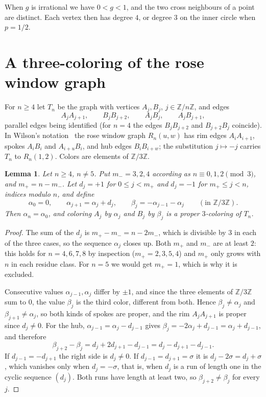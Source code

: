 \documentclass[11pt]{amsart}
\newtheorem{lemma}[theorem]{Lemma}
\theoremstyle{remark}
\numberwithin{equation}{section}
\newcommand{\Z}{\mathbb{Z}}
\begin{document}
When $g$ is irrational we have $0<g<1$, and the two cross neighbours of
a point are distinct. Each vertex then has degree $4$, or degree $3$ on
the inner circle when $p=1/2$.

\section{A three-coloring of the rose window graph}\label{sec:palette}

For $n\ge4$ let $T_n$ be the graph with vertices $A_j,B_j$,
$j\in\Z/n\Z$, and edges
\begin{equation}\label{eq:Tn}
A_jA_{j+1},\qquad B_jB_{j+2},\qquad A_jB_j,\qquad A_jB_{j+1},
\end{equation}
parallel edges being identified (for $n=4$ the edges $B_jB_{j+2}$ and
$B_{j+2}B_j$ coincide). In Wilson's notation~\cite{Wil08} the rose
window graph $R_n(u,w)$ has rim edges $A_iA_{i+1}$, spokes $A_iB_i$
and $A_{i+u}B_i$, and hub edges $B_iB_{i+w}$; the substitution
$j\mapsto-j$ carries $T_n$ to $R_n(1,2)$. Colors are elements of
$\Z/3\Z$.

\begin{lemma}\label{lem:palette}
Let $n\ge4$, $n\ne5$. Put $m_-=3,2,4$ according as $n\equiv0,1,2\pmod3$,
and $m_+=n-m_-$. Let $d_j=+1$ for $0\le j<m_+$ and $d_j=-1$ for
$m_+\le j<n$, indices modulo $n$, and define
\begin{equation}\label{eq:palette}
\alpha_0=0,\qquad \alpha_{j+1}=\alpha_j+d_j,\qquad \beta_j=-\alpha_{j-1}-\alpha_j\qquad(\text{in }\Z/3\Z).
\end{equation}
Then $\alpha_n=\alpha_0$, and coloring $A_j$ by $\alpha_j$ and $B_j$ by $\beta_j$ is a proper
$3$-coloring of $T_n$.
\end{lemma}

\begin{proof}
The sum of the $d_j$ is $m_+-m_-=n-2m_-$, which is divisible by $3$ in
each of the three cases, so the sequence $\alpha_j$ closes up. Both
$m_+$ and $m_-$ are at least $2$: this holds for $n=4,6,7,8$ by
inspection ($m_+=2,3,5,4$) and $m_+$ only grows with $n$ in each residue
class. For $n=5$ we would get $m_+=1$, which is why it is excluded.

Consecutive values $\alpha_{j-1},\alpha_j$ differ by $\pm1$, and since the three
elements of $\Z/3\Z$ sum to $0$, the value $\beta_j$ is the third color,
different from both. Hence $\beta_j\ne \alpha_j$ and $\beta_{j+1}\ne \alpha_j$, so both
kinds of spokes are proper, and the rim $A_jA_{j+1}$ is proper since
$d_j\ne0$. For the hub, $\alpha_{j-1}=\alpha_j-d_{j-1}$ gives
$\beta_j=-2\alpha_j+d_{j-1}=\alpha_j+d_{j-1}$, and therefore
\begin{equation}\label{eq:hub}
\beta_{j+2}-\beta_j=d_j+2d_{j+1}-d_{j-1}=d_j-d_{j+1}-d_{j-1}.
\end{equation}
If $d_{j-1}=-d_{j+1}$ the right side is $d_j\ne0$. If
$d_{j-1}=d_{j+1}=\sigma$ it is $d_j-2\sigma=d_j+\sigma$, which
vanishes only when $d_j=-\sigma$, that is, when $d_j$ is a run of
length one in the cyclic sequence $(d_j)$. Both runs have length at least
two, so $\beta_{j+2}\ne \beta_j$ for every $j$.
\end{proof}
\end{document}
